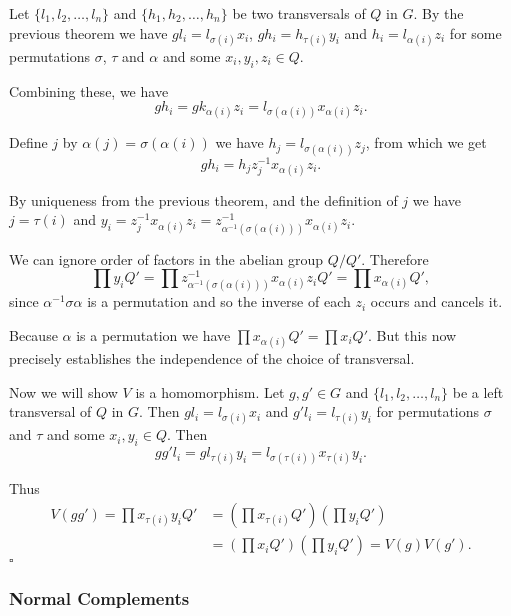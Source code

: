 \documentclass[10pt]{article}
\newenvironment{proof}[1][Proof]{\begin{trivlist}
\item[\hskip \labelsep {\itshape #1}]}{\end{trivlist}}
\begin{document}
\begin{proof}
Let $\{l_1, l_2, \ldots, l_n\}$ and $\{h_1, h_2, \ldots, h_n\}$ be two transversals of $Q$ in $G$. By the previous theorem we have $gl_i = l_{\sigma(i)}x_i$, $gh_i = h_{\tau(i)}y_i$ and $h_i = l_{\alpha(i)}z_i$ for some permutations $\sigma$, $\tau$ and $\alpha$ and some $x_i, y_i, z_i \in Q$.

Combining these, we have
$$gh_i = gk_{\alpha(i)}z_i = l_{\sigma(\alpha(i))}x_{\alpha(i)}z_i.$$

Define $j$ by $\alpha(j) = \sigma(\alpha(i))$ we have $h_j = l_{\sigma(\alpha(i))}z_j$, from which we get
$$gh_i = h_jz_j^{-1}x_{\alpha(i)}z_i.$$

By uniqueness from the previous theorem, and the definition of $j$ we have $j = \tau(i)$ and
$y_i = z_j^{-1}x_{\alpha(i)}z_i = z_{\alpha^{-1}(\sigma(\alpha(i)))}^{-1}x_{\alpha(i)}z_i.$

We can ignore order of factors in the abelian group $Q/Q'$. Therefore
$$\prod y_iQ' = \prod z_{\alpha^{-1}(\sigma(\alpha(i)))}^{-1}x_{\alpha(i)}z_iQ' = \prod x_{\alpha(i)}Q',$$
since $\alpha^{-1}\sigma\alpha$ is a permutation and so the inverse of each $z_i$ occurs and cancels it.

Because $\alpha$ is a permutation we have $\prod x_{\alpha(i)}Q' = \prod x_iQ'$. But this now precisely establishes the independence of the choice of transversal.

Now we will show $V$ is a homomorphism. Let $g, g' \in G$ and $\{l_1, l_2, \ldots, l_n\}$ be a left transversal of $Q$ in $G$. Then $gl_i = l_{\sigma(i)}x_i$ and $g'l_i = l_{\tau(i)}y_i$ for permutations $\sigma$ and $\tau$ and some $x_i, y_i \in Q$. Then
$$gg'l_i = gl_{\tau(i)}y_i = l_{\sigma(\tau(i))}x_{\tau(i)}y_i.$$

Thus
\begin{align*}
V(gg') = \prod x_{\tau(i)}y_iQ' &= \left(\prod x_{\tau(i)}Q'\right)\left(\prod y_{i}Q'\right)\\
                                &= \left(\prod x_{i}Q'\right)\left(\prod y_{i}Q'\right) = V(g)V(g').
\end{align*} $\square$
\end{proof}

\subsubsection{Normal Complements}
\end{document}
